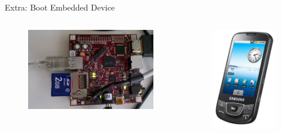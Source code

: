 \documentclass{workshop}
\begin{document}
\begin{frame}{Extra: Boot Embedded Device}
  \begin{columns}
    \begin{column}[l]{0.45\textwidth}
      \begin{figure}
         \includegraphics[scale=0.17]{img/beagle.jpg}
      \end{figure}
    \end{column}
    \begin{column}[l]{0.45\textwidth}
      \begin{figure}
         \includegraphics[scale=0.65]{img/phone.jpg}

\end{figure}
\end{column}
\end{columns}
\end{frame}
\end{document}
